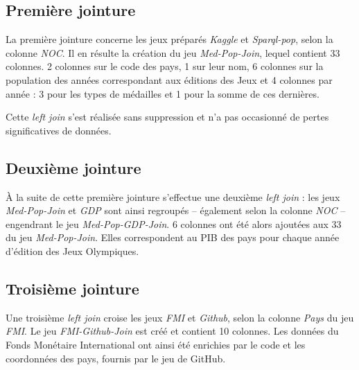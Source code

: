 \documentclass[hidelinks, 12pt]{report}
\begin{document}
%





\label{join}\subsection{Première jointure}

La première jointure concerne les jeux préparés \textit{Kaggle} et \textit{Sparql-pop}, selon la colonne \textit{NOC}. Il en résulte la création du jeu \textit{Med-Pop-Join}, lequel contient 33 colonnes. 2 colonnes sur le code des pays, 1 sur leur nom, 6 colonnes sur la population des années correspondant aux éditions des Jeux et 4 colonnes par année : 3 pour les types de médailles et 1 pour la somme de ces dernières.

Cette \textit{left join} s'est réalisée sans suppression et n'a pas occasionné de pertes significatives de données.





%





\subsection{Deuxième jointure}

À la suite de cette première jointure s'effectue une deuxième \textit{left join} : les jeux \textit{Med-Pop-Join} et \textit{GDP} sont ainsi regroupés -- également selon la colonne \textit{NOC} -- engendrant le jeu \textit{Med-Pop-GDP-Join}. 6 colonnes ont été alors ajoutées aux 33 du jeu \textit{Med-Pop-Join}. Elles correspondent au PIB des pays pour chaque année d'édition des Jeux Olympiques.





%





\subsection{Troisième jointure}

Une troisième \textit{left join} croise les jeux \textit{FMI} et \textit{Github}, selon la colonne \textit{Pays} du jeu \textit{FMI}. Le jeu \textit{FMI-Github-Join} est créé et contient 10 colonnes. Les données du Fonds Monétaire International ont ainsi été enrichies par le code et les coordonnées des pays, fournis par le jeu de GitHub.
\end{document}
